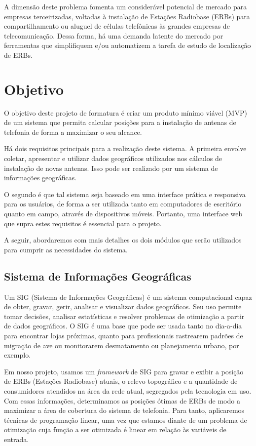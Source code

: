 \documentclass[]{politex}
\begin{document}
A dimensão deste problema fomenta um considerável potencial de mercado para
empresas terceirizadas, voltadas à instalação de Estações Radiobase (ERBs) para
compartilhamento ou aluguel de células telefônicas às grandes empresas de
telecomunicação. Dessa forma, há uma demanda latente do mercado por ferramentas
que simplifiquem e/ou automatizem a tarefa de estudo de localização de ERBs.

\section{Objetivo}

O objetivo deste projeto de formatura é criar um produto mínimo viável (MVP) de
um sistema que permita calcular posições para a instalação de antenas de
telefonia de forma a maximizar o seu alcance.

Há dois requisitos principais para a realização deste sistema. A primeira
envolve coletar, apresentar e utilizar dados geográficos utilizados nos cálculos
de instalação de novas antenas. Isso pode ser realizado por um sistema de
informações geográficas.

O segundo é que tal sistema seja baseado em uma interface prática e responsiva
para os usuários, de forma a ser utilizada tanto em computadores de escritório
quanto em campo, através de dispositivos móveis. Portanto, uma interface web que
supra estes requisitos é essencial para o projeto.

A seguir, abordaremos com mais detalhes os dois módulos que serão utilizados
para cumprir as necessidades do sistema.

\subsection{Sistema de Informações Geográficas}

Um SIG (Sistema de Informações Geográficas) é um sistema computacional capaz de
obter, gravar, gerir, analisar e visualizar dados geográficos. Seu uso permite
tomar decisões, analisar estatísticas e resolver problemas de otimização a
partir de dados geográficos. O SIG é uma base que pode ser usada tanto no
dia-a-dia para encontrar lojas próximas, quanto para profissionais rastrearem
padrões de migração de ave ou monitorarem desmatamento ou planejamento urbano,
por exemplo.

Em nosso projeto, usamos um \textit{framework} de SIG para gravar e exibir a
posição de ERBs (Estações Radiobase) atuais, o relevo topográfico e a quantidade
de consumidores atendidos na área da rede atual, segregados pela tecnologia em
uso. Com essas informações, determinamos as posições ótimas de ERBs de modo a
maximizar a área de cobertura do sistema de telefonia. Para tanto, aplicaremos
técnicas de programação linear, uma vez que estamos diante de um problema de
otimização cuja função a ser otimizada é linear em relação às variáveis de
entrada.
\end{document}
